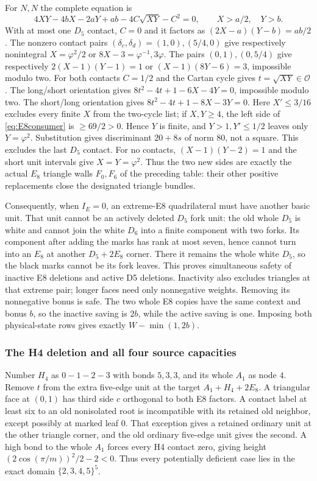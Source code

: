 \documentclass[11pt]{article}
\begin{document}
For $N,N$ the complete equation is
\begin{equation}\label{eq:E8consumer}
4XY-4bX-2aY+ab-4C\sqrt{XY}-C^2=0,
\qquad X>a/2,\quad Y>b.
\end{equation}
With at most one $D_5$ contact, $C=0$ and it factors as
$(2X-a)(Y-b)=ab/2$.
The nonzero contact pairs $(\delta_c,\delta_d)=(1,0),(5/4,0)$
give respectively nonintegral $X=\varphi^2/2$ or
$8X-3=\varphi^{-1},3\varphi$.
The pairs $(0,1),(0,5/4)$ give respectively
$2(X-1)(Y-1)=1$ or $(X-1)(8Y-6)=3$, impossible modulo two.
For both contacts $C=1/2$ and the Cartan cycle gives
$t=\sqrt{XY}\in\mathcal O$.
The long/short orientation gives
$8t^2-4t+1-6X-4Y=0$, impossible modulo two.
The short/long orientation gives
$8t^2-4t+1-8X-3Y=0$.
Here $X'\le3/16$ excludes every finite $X$ from the two-cycle list;
if $X,Y\ge4$, the left side of \eqref{eq:E8consumer} is
$\ge69/2>0$. Hence $Y$ is finite, and $Y>1,Y'\le1/2$ leaves
only $Y=\varphi^2$. Substitution gives discriminant $20+8s$ of
norm $80$, not a square. This excludes the last $D_5$ contact.
For no contacts, $(X-1)(Y-2)=1$ and the short unit intervals give
$X=Y=\varphi^2$. Thus the two new sides are exactly the actual
$E_8$ triangle walls $F_0,F_6$ of the preceding table: their other
positive replacements close the designated triangle bundles.

Consequently, when $I_E=0$, an extreme-E8 quadrilateral must have
another basic unit. That unit cannot be an actively deleted $D_5$
fork unit: the old whole $D_5$ is white and cannot join the white
$D_6$ into a finite component with two forks. Its component after
adding the marks has rank at most seven, hence cannot turn into an
$E_8$ at another $D_5+2E_8$ corner. There it remains the whole white
$D_5$, so the black marks cannot be its fork leaves. This proves
simultaneous safety of inactive E8 deletions and active D5 deletions.
Inactivity also excludes triangles at that extreme pair; longer faces
need only nonnegative weights. Removing its nonnegative bonus is safe.
The two whole E8 copies have the same context and bonus $b$, so the
inactive saving is $2b$, while the active saving is one. Imposing
both physical-state rows gives exactly $W-\min(1,2b)$.

\subsubsection{The H4 deletion and all four source capacities}
Number $H_4$ as $0-1-2-3$ with bonds $5,3,3$, and its whole $A_1$
as node $4$. Remove $t$ from the extra five-edge unit at the target
$A_1+H_4+2E_8$. A triangular face at $(0,1)$ has third side $c$
orthogonal to both E8 factors. A contact label at least six to an
old nonisolated root is incompatible with its retained old neighbor,
except possibly at marked leaf $0$. That exception gives a retained
ordinary unit at the other triangle corner, and the old ordinary
five-edge unit gives the second. A high bond to the whole $A_1$
forces every H4 contact zero, giving height
$(2\cos(\pi/m))^2/2-2<0$. Thus every potentially deficient case
lies in the exact domain $\{2,3,4,5\}^5$.
\end{document}
